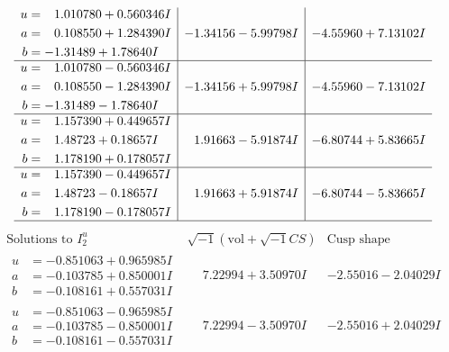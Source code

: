 \documentclass[1p]{elsarticle_modified}
\theoremstyle{definition}
\newcommand{\I}{\sqrt{-1}}
\begin{document}
$$\begin{array}{c|c|c}
\begin{aligned}
u &= \phantom{-}1.010780 + 0.560346 I \\
a &= \phantom{-}0.108550 + 1.284390 I \\
b &= -1.31489 + 1.78640 I\end{aligned}
 & -1.34156 - 5.99798 I & -4.55960 + 7.13102 I \\ \hline\begin{aligned}
u &= \phantom{-}1.010780 - 0.560346 I \\
a &= \phantom{-}0.108550 - 1.284390 I \\
b &= -1.31489 - 1.78640 I\end{aligned}
 & -1.34156 + 5.99798 I & -4.55960 - 7.13102 I \\ \hline\begin{aligned}
u &= \phantom{-}1.157390 + 0.449657 I \\
a &= \phantom{-}1.48723 + 0.18657 I \\
b &= \phantom{-}1.178190 + 0.178057 I\end{aligned}
 & \phantom{-}1.91663 - 5.91874 I & -6.80744 + 5.83665 I \\ \hline\begin{aligned}
u &= \phantom{-}1.157390 - 0.449657 I \\
a &= \phantom{-}1.48723 - 0.18657 I \\
b &= \phantom{-}1.178190 - 0.178057 I\end{aligned}
 & \phantom{-}1.91663 + 5.91874 I & -6.80744 - 5.83665 I\\
 \hline 
 \end{array}$$\newpage$$\begin{array}{c|c|c}  
\text{Solutions to }I^u_{2}& \I (\text{vol} + \sqrt{-1}CS) & \text{Cusp shape}\\
 \hline 
\begin{aligned}
u &= -0.851063 + 0.965985 I \\
a &= -0.103785 + 0.850001 I \\
b &= -0.108161 + 0.557031 I\end{aligned}
 & \phantom{-}7.22994 + 3.50970 I & -2.55016 - 2.04029 I \\ \hline\begin{aligned}
u &= -0.851063 - 0.965985 I \\
a &= -0.103785 - 0.850001 I \\
b &= -0.108161 - 0.557031 I\end{aligned}
 & \phantom{-}7.22994 - 3.50970 I & -2.55016 + 2.04029 I \\ \hline\begin{aligned}

\end{aligned}
\end{array}$$
\end{document}
